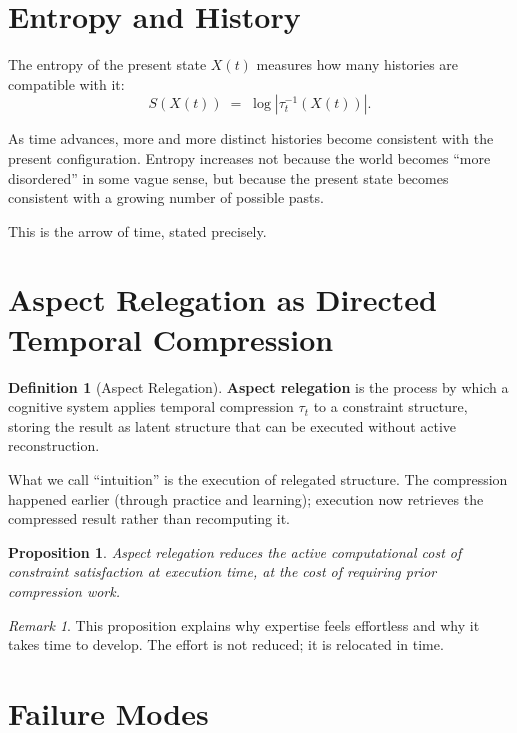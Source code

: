 \documentclass[11pt]{book}
\theoremstyle{plain}
\newtheorem{proposition}[theorem]{Proposition}
\theoremstyle{definition}
\newtheorem{definition}[theorem]{Definition}
\theoremstyle{remark}
\newtheorem{remark}[theorem]{Remark}
\newcommand{\Ss}{S}
\begin{document}
\section{Entropy and History}

The entropy of the present state $X(t)$ measures how many histories are
compatible with it:
\[
  \Ss(X(t)) \;=\; \log |\tau_t^{-1}(X(t))|.
\]

As time advances, more and more distinct histories become consistent with
the present configuration. Entropy increases not because the world becomes
``more disordered'' in some vague sense, but because the present state
becomes consistent with a growing number of possible pasts.

This is the arrow of time, stated precisely.

\section{Aspect Relegation as Directed Temporal Compression}

\begin{definition}[Aspect Relegation]
\textbf{Aspect relegation} is the process by which a cognitive system
applies temporal compression $\tau_t$ to a constraint structure,
storing the result as latent structure that can be executed without
active reconstruction.
\end{definition}

What we call ``intuition'' is the execution of relegated structure. The
compression happened earlier (through practice and learning); execution
now retrieves the compressed result rather than recomputing it.

\begin{proposition}
Aspect relegation reduces the active computational cost of constraint
satisfaction at execution time, at the cost of requiring prior compression
work.
\end{proposition}

\begin{remark}
This proposition explains why expertise feels effortless and why it takes
time to develop. The effort is not reduced; it is relocated in time.
\end{remark}

\section{Failure Modes}
\end{document}
